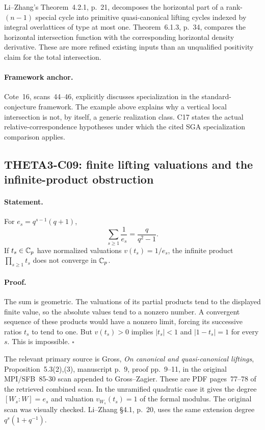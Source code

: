 \documentclass[11pt]{article}
\theoremstyle{definition}\newtheorem{definition}[theorem]{Definition}\newtheorem{remark}[theorem]{Remark}
\begin{document}
Li--Zhang's Theorem~4.2.1, p.~21, decomposes the horizontal part of
a rank-$(n-1)$ special cycle into primitive quasi-canonical lifting
cycles indexed by integral overlattices of type at most one.
Theorem~6.1.3, p.~34, compares the horizontal intersection function
with the corresponding horizontal density derivative. These are
more refined existing inputs than an unqualified positivity claim
for the total intersection.

\paragraph{Framework anchor.}
Cote~16, scans~44--46, explicitly discusses specialization in the
standard-conjecture framework.  The example above explains why a
vertical local intersection is not, by itself, a generic realization
class.  C17 states the actual relative-correspondence hypotheses under
which the cited SGA specialization comparison applies.

\subsection{THETA3-C09: finite lifting valuations and the infinite-product obstruction}\label{C09}

\paragraph{Statement.}
For $e_s=q^{s-1}(q+1)$,
\[
 \sum_{s\geq1}\frac1{e_s}=\frac{q}{q^2-1}.
\]
If $t_s\in\mathbb C_p$ have normalized valuations $v(t_s)=1/e_s$, the
infinite product $\prod_{s\geq1}t_s$ does not converge in $\mathbb C_p$.

\paragraph{Proof.}
The sum is geometric. The valuations of its partial products tend
to the displayed finite value, so the absolute values tend to a
nonzero number. A convergent sequence of these products would have
a nonzero limit, forcing its successive ratios $t_s$ to tend to
one. But $v(t_s)>0$ implies $|t_s|<1$ and $|1-t_s|=1$ for every
$s$. This is impossible. $\square$

The relevant primary source is Gross, \emph{On canonical and
quasi-canonical liftings}, Proposition~5.3(2),(3), manuscript p.~9,
proof pp.~9--11, in the original MPI/SFB~85-30 scan appended to
Gross--Zagier. These are PDF pages~77--78 of the retrieved combined
scan. In the unramified quadratic case it gives the degree
$[W_s:W]=e_s$ and valuation $v_{W_s}(t_s)=1$ of the formal modulus.
The original scan was visually checked. Li--Zhang \S4.1, p.~20,
uses the same extension degree $q^s(1+q^{-1})$.
\end{document}
